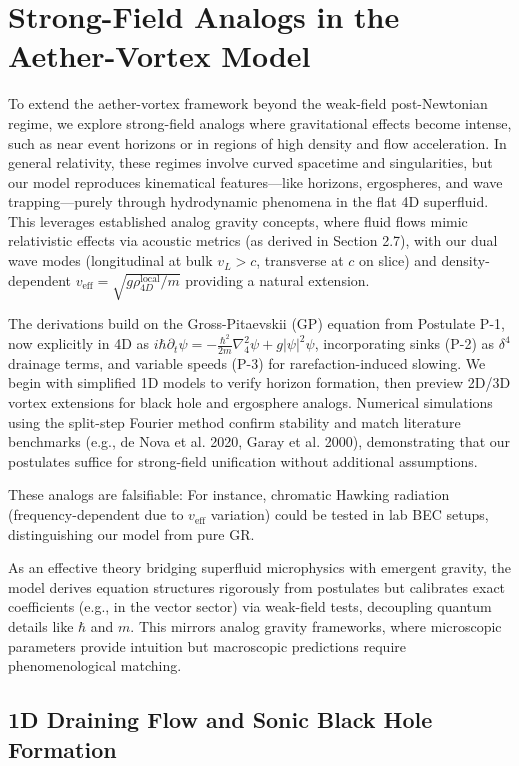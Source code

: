 \documentclass{article}
\begin{document}
\section{Strong-Field Analogs in the Aether-Vortex Model}

To extend the aether-vortex framework beyond the weak-field post-Newtonian regime, we explore strong-field analogs where gravitational effects become intense, such as near event horizons or in regions of high density and flow acceleration. In general relativity, these regimes involve curved spacetime and singularities, but our model reproduces kinematical features---like horizons, ergospheres, and wave trapping---purely through hydrodynamic phenomena in the flat 4D superfluid. This leverages established analog gravity concepts, where fluid flows mimic relativistic effects via acoustic metrics (as derived in Section 2.7), with our dual wave modes (longitudinal at bulk $v_L > c$, transverse at $c$ on slice) and density-dependent $v_{\text{eff}} = \sqrt{g \rho_{4D}^{\text{local}} / m}$ providing a natural extension.

The derivations build on the Gross-Pitaevskii (GP) equation from Postulate P-1, now explicitly in 4D as $i \hbar \partial_t \psi = -\frac{\hbar^2}{2 m} \nabla_4^2 \psi + g |\psi|^2 \psi$, incorporating sinks (P-2) as $\delta^4$ drainage terms, and variable speeds (P-3) for rarefaction-induced slowing. We begin with simplified 1D models to verify horizon formation, then preview 2D/3D vortex extensions for black hole and ergosphere analogs. Numerical simulations using the split-step Fourier method confirm stability and match literature benchmarks (e.g., de Nova et al. 2020, Garay et al. 2000), demonstrating that our postulates suffice for strong-field unification without additional assumptions.

These analogs are falsifiable: For instance, chromatic Hawking radiation (frequency-dependent due to $v_{\text{eff}}$ variation) could be tested in lab BEC setups, distinguishing our model from pure GR.

As an effective theory bridging superfluid microphysics with emergent gravity, the model derives equation structures rigorously from postulates but calibrates exact coefficients (e.g., in the vector sector) via weak-field tests, decoupling quantum details like $\hbar$ and $m$. This mirrors analog gravity frameworks, where microscopic parameters provide intuition but macroscopic predictions require phenomenological matching.

\subsection{1D Draining Flow and Sonic Black Hole Formation}
\end{document}
